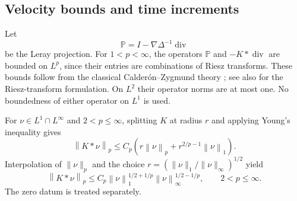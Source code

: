 \documentclass[11pt,a4paper,reqno]{amsart}
\theoremstyle{plain}
\theoremstyle{definition}
\theoremstyle{remark}
\numberwithin{equation}{section}
\newcommand{\PP}{\mathbb P}
\newcommand{\Div}{\operatorname{div}}
\newcommand{\norm}[2]{\left\|#1\right\|_{#2}}
\begin{document}
\subsection{Velocity bounds and time increments}

Let
\[
 \PP=I-\nabla\Delta^{-1}\Div
\]
be the Leray projection. For $1<p<\infty$, the operators $\PP$ and
$-K*\Div$ are bounded on $L^p$, since their entries are combinations
of Riesz transforms. These bounds follow from the classical
Calder\'on--Zygmund theory \cite{CalderonZygmund}; see also
\cite[Chapters~II--III]{Stein} for the Riesz-transform formulation. On $L^2$ their operator
norms are at most one. No boundedness of either operator on $L^1$ is
used.

For $\nu\in L^1\cap L^\infty$ and $2<p\le\infty$, splitting $K$ at
radius $r$ and applying Young's inequality gives
\[
 \norm{K*\nu}p
 \le C_p\left(r\norm\nu p+r^{2/p-1}\norm\nu1\right).
\]
Interpolation of $\|\nu\|_p$ and the choice
$r=(\|\nu\|_1/\|\nu\|_\infty)^{1/2}$ yield
\begin{equation}\label{eq:kernel-bound}
 \norm{K*\nu}p\le
 C_p\norm\nu1^{1/2+1/p}\norm\nu\infty^{1/2-1/p},
 \qquad 2<p\le\infty.
\end{equation}
The zero datum is treated separately.
\end{document}
